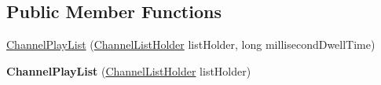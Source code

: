 \subsection*{Public Member Functions}
\begin{DoxyCompactItemize}
\item 
\hyperlink{classgov_1_1fnal_1_1ppd_1_1dd_1_1channel_1_1ChannelPlayList_ae3affc943df1f88088d8e3ffd9377ed3}{Channel\-Play\-List} (\hyperlink{interfacegov_1_1fnal_1_1ppd_1_1dd_1_1channel_1_1ChannelListHolder}{Channel\-List\-Holder} list\-Holder, long millisecond\-Dwell\-Time)
\item 
\hypertarget{classgov_1_1fnal_1_1ppd_1_1dd_1_1channel_1_1ChannelPlayList_a501e9386af6bd9603c2bb1e68aff17eb}{{\bfseries Channel\-Play\-List} (\hyperlink{interfacegov_1_1fnal_1_1ppd_1_1dd_1_1channel_1_1ChannelListHolder}{Channel\-List\-Holder} list\-Holder)}\label{classgov_1_1fnal_1_1ppd_1_1dd_1_1channel_1_1ChannelPlayList_a501e9386af6bd9603c2bb1e68aff17eb}


\end{DoxyCompactItemize}
